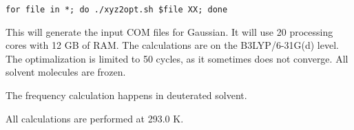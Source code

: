 \begin{lstlisting}[caption=XYZ to COM]
for file in *; do ./xyz2opt.sh $file XX; done
\end{lstlisting}

This will generate the input COM files for Gaussian. It will use 20 processing 
cores with 12 GB of RAM. The calculations are on the B3LYP/6-31G(d) level. 
The optimalization is limited to 50 cycles, as it sometimes does not converge.
All solvent molecules are frozen.

The frequency calculation happens in deuterated solvent.

All calculations are performed at 293.0 K.

